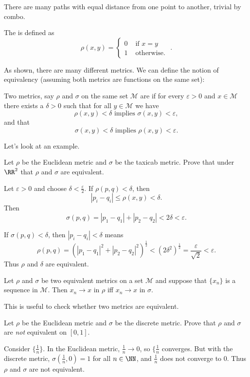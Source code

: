 There are many paths with equal distance from one point to another, trivial by combo. 

\begin{definition}
	The  is defined as 
	\[ \rho(x,y) = \begin{cases} 0 &\text{ if } x = y \\ 1 &\text{ otherwise. } \end{cases}. \] 
\end{definition}
As shown, there are many different metrics. We can define the notion of equivalency (assuming both metrics are functions on the same set):
\begin{definition}
	Two metrics, say $\rho$ and $\sigma$ on the same set $\mathcal{M}$ are  if for every $\varepsilon > 0$ and $x \in \mathcal{M}$ there exists a $\delta > 0$ such that for all $y \in \mathcal{M}$ we have 
	\[ \rho(x,y) < \delta \text { implies } \sigma(x,y) < \varepsilon, \] 
	and that 
	\[ \sigma(x,y) < \delta \text{ implies } \rho(x,y) < \varepsilon. \]
\end{definition}
Let's look at an example. 
\begin{example}
	Let $\rho$ be the Euclidean metric and $\sigma$ be the taxicab metric. Prove that under $\RR^2$ that $\rho$ and $\sigma$ are equivalent. 
\end{example}
\begin{soln}
	Let $\varepsilon > 0$ and choose $\delta < \frac{\varepsilon}{2}$. If $\rho(p,q) < \delta$, then \[|p_i - q_i| \leq \rho(x,y) < \delta. \] Then \[ \sigma(p,q) = |p_1 - q_1| + |p_2 - q_2| < 2\delta < \varepsilon. \] 

	If $\sigma(p,q) < \delta$, then $|p_i - q_i| < \delta$ means 
	\[ \rho(p,q) = ( |p_1 - q_1|^2 + |p_2 - q_2|^2 )^\frac{1}{2} < (2\delta^2)^\frac{1}{2} = \frac{\varepsilon}{\sqrt{2}} < \varepsilon. \]
	Thus $\rho$ and $\delta$ are equivalent. 
\end{soln}

\begin{proposition}
	Let $\rho$ and $\sigma$ be two equivalent metrics on a set $\mathcal{M}$ and suppose that $\{x_n\}$ is a sequence in $\mathcal{M}$. Then $x_n \to x$ in $\rho$ iff $x_n \to x$ in $\sigma$. 
\end{proposition}
This is useful to check whether two metrics are equivalent. 
\begin{example}
	Let $\rho$ be the Euclidean metric and $\sigma$ be the discrete metric. Prove that $\rho$ and $\sigma$ are \emph{not} equivalent on $[0,1]$. 
\end{example}
\begin{soln}
	Consider $\{\frac{1}{n}\}$. In the Euclidean metric, $\frac{1}{n} \to 0$, so $\{\frac{1}{n}$ converges. But with the discrete metric, $\sigma(\frac{1}{n}, 0) = 1$ for all $n \in \NN$, and $\frac{1}{n}$ does not converge to 0. Thus $\rho$ and $\sigma$ are not equivalent. 
\end{soln}

